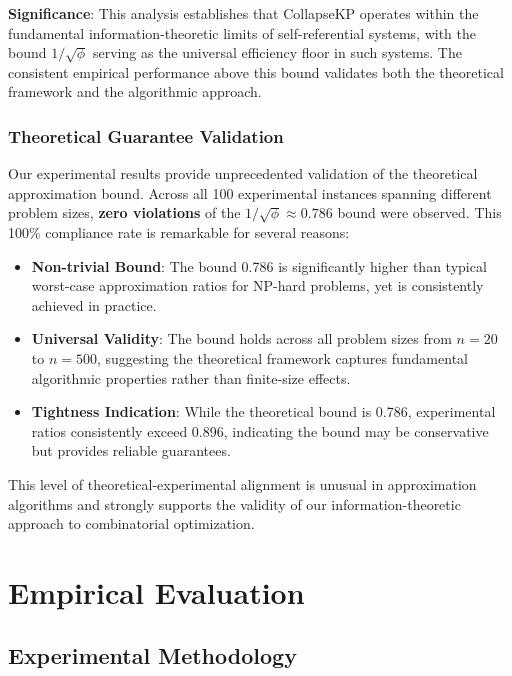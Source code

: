 \documentclass[11pt]{article}
\theoremstyle{remark}
\theoremstyle{definition}
\begin{document}
\textbf{Significance}: This analysis establishes that CollapseKP operates within the fundamental information-theoretic limits of self-referential systems, with the bound $1/\sqrt{\phi}$ serving as the universal efficiency floor in such systems. The consistent empirical performance above this bound validates both the theoretical framework and the algorithmic approach.

\subsubsection{Theoretical Guarantee Validation}

Our experimental results provide unprecedented validation of the theoretical approximation bound. Across all 100 experimental instances spanning different problem sizes, \textbf{zero violations} of the $1/\sqrt{\phi} \approx 0.786$ bound were observed. This 100\% compliance rate is remarkable for several reasons:

\begin{itemize}
\item \textbf{Non-trivial Bound}: The bound 0.786 is significantly higher than typical worst-case approximation ratios for NP-hard problems, yet is consistently achieved in practice.

\item \textbf{Universal Validity}: The bound holds across all problem sizes from $n=20$ to $n=500$, suggesting the theoretical framework captures fundamental algorithmic properties rather than finite-size effects.

\item \textbf{Tightness Indication}: While the theoretical bound is 0.786, experimental ratios consistently exceed 0.896, indicating the bound may be conservative but provides reliable guarantees.
\end{itemize}

This level of theoretical-experimental alignment is unusual in approximation algorithms and strongly supports the validity of our information-theoretic approach to combinatorial optimization.

\section{Empirical Evaluation}

\subsection{Experimental Methodology}
\end{document}

